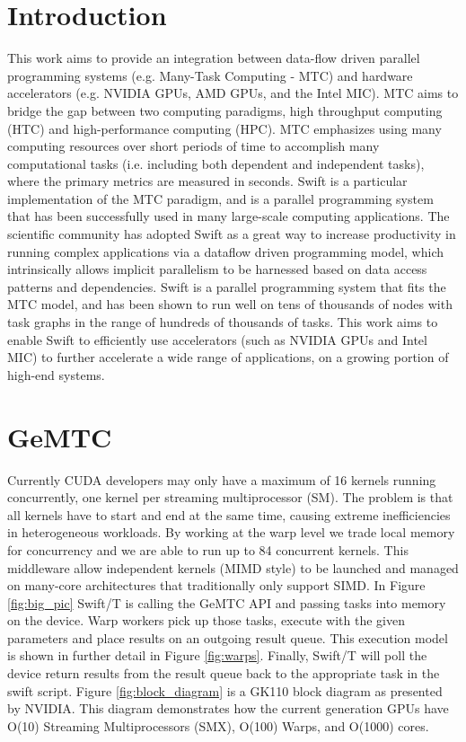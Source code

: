 \documentclass[conference]{IEEEtran}
\begin{document}
\section{Introduction}
This work aims to provide an integration between data-flow driven parallel programming systems (e.g. Many-Task Computing - MTC) and hardware accelerators \cite{kriederGCASR12} (e.g. NVIDIA GPUs, AMD GPUs, and the Intel MIC). MTC aims to bridge the gap between two computing paradigms, high throughput computing (HTC) and high-performance computing (HPC). MTC emphasizes using many computing resources over short periods of time to accomplish many computational tasks (i.e. including both dependent and independent tasks), where the primary metrics are measured in seconds.\cite{raicu2008toward} Swift is a particular implementation of the MTC paradigm, and is a parallel programming system that has been successfully used in many large-scale computing applications. \cite{zhao2007swift} The scientific community has adopted Swift as a great way to increase productivity in running complex applications via a dataflow driven programming model, which intrinsically allows implicit parallelism to be harnessed based on data access patterns and dependencies. Swift is a parallel programming system that fits the MTC model, and has been shown to run well on tens of thousands of nodes with task graphs in the range of hundreds of thousands of tasks. This work aims to enable Swift to efficiently use accelerators (such as NVIDIA GPUs and Intel MIC) to further accelerate a wide range of applications, on a growing portion of high-end systems.

\section{GeMTC}

Currently CUDA developers may only have a maximum of 16 kernels running concurrently, one kernel per streaming multiprocessor (SM). The problem is that all kernels have to start and end at the same time, causing extreme inefficiencies in heterogeneous workloads. By working at the warp level we trade local memory for concurrency and we are able to run up to 84 concurrent kernels. \cite{kriederSC12} This middleware allow independent kernels (MIMD style) to be launched and managed on many-core architectures that traditionally only support SIMD. \cite{kriederXSEDE12} In Figure \ref{fig:big_pic} Swift/T is calling the GeMTC API and passing tasks into memory on the device. Warp workers pick up those tasks, execute with the given parameters and place results on an outgoing result queue. This execution model is shown in further detail in Figure \ref{fig:warps}. Finally, Swift/T will poll the device return results from the result queue back to the appropriate task in the swift script. Figure \ref{fig:block_diagram} is a  GK110 block diagram as presented by NVIDIA. \cite{GK110} This diagram demonstrates how the current generation GPUs have O(10) Streaming Multiprocessors (SMX), O(100) Warps, and O(1000) cores.
\end{document}
